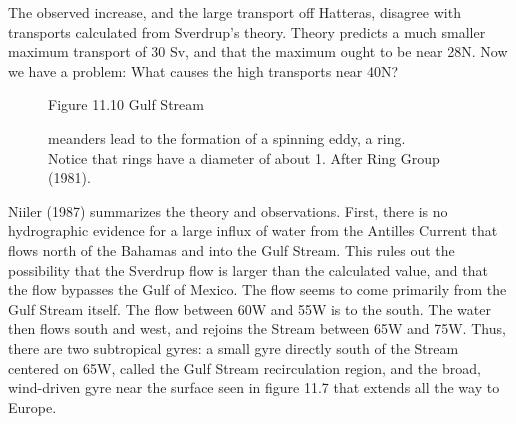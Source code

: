 The observed increase, and the large transport off Hatteras, disagree
with transports calculated from Sverdrup's theory. Theory predicts a
much smaller maximum transport of 30 Sv, and that the maximum ought to
be near 28\degrees N.  Now we have a problem: What causes the high
transports near 40\degrees N?

\begin{figure}[t!]
\centering
\footnotesize
Figure 11.10 Gulf Stream \rule{0mm}{5ex}meanders lead to the formation
of a spinning eddy, a ring.\\Notice that rings have a diameter of
about 1\degrees. After Ring Group (1981).

\label{fig:ringformation}
\vspace{-3ex}
\end{figure}

Niiler (1987) summarizes the theory and observations. First, there is
no hydrographic evidence for a large influx of water from the Antilles
Current that flows north of the Bahamas and into the Gulf Stream. This
rules out the possibility that the Sverdrup flow is larger than the
calculated value, and that the flow bypasses the Gulf of Mexico. The
flow seems to come primarily from the Gulf Stream itself. The flow
between 60\degrees W and 55\degrees W is to the south. The water then
flows south and west, and rejoins the Stream between 65\degrees W and
75\degrees W. Thus, there are two subtropical gyres: a small gyre
directly south of the Stream centered on 65\degrees W, called the Gulf
Stream recirculation region, and the broad, wind-driven gyre near the
surface seen in figure 11.7 that extends all the way to Europe.



